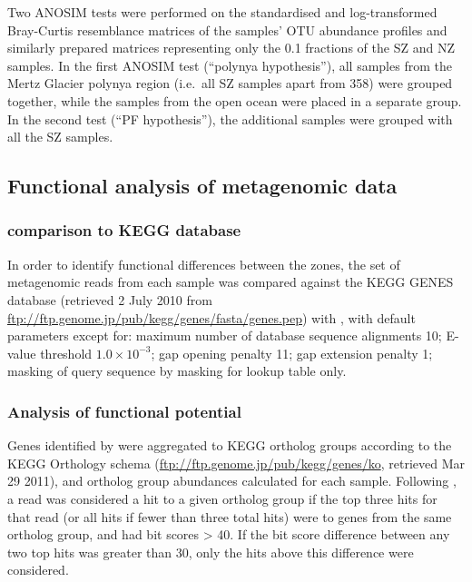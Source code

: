 

Two \ac{ANOSIM} tests were performed on the standardised and log-transformed Bray-Curtis resemblance matrices of the samples' \ac{OTU} abundance profiles and similarly prepared matrices representing only the 0.1 \micron{} fractions of the \ac{SZ} and \ac{NZ} samples.
In the first \ac{ANOSIM} test (``polynya hypothesis''), all samples from the Mertz Glacier polynya region (i.e.\ all \ac{SZ} samples apart from 358) were grouped together, while the samples from the open ocean were placed in a separate group.
In the second test (``\ac{PF} hypothesis''), the additional samples were grouped with all the \ac{SZ} samples.

\subsection{Functional analysis of metagenomic data}

\subsubsection{ comparison to KEGG database}

In order to identify functional differences between the zones, the set of metagenomic reads from each sample was compared against the \ac{KEGG} GENES database (retrieved 2 July 2010 from \url{ftp://ftp.genome.jp/pub/kegg/genes/fasta/genes.pep}) with , with default parameters except for: maximum number of database sequence alignments 10; E-value threshold $1.0\times10^{-3}$; gap opening penalty 11; gap extension penalty 1; masking of query sequence by  masking for lookup table only.

\subsubsection{Analysis of functional potential}

Genes identified by  were aggregated to \ac{KEGG} ortholog groups according to the \ac{KEGG} Orthology schema (\url{ftp://ftp.genome.jp/pub/kegg/genes/ko}, retrieved Mar 29 2011), and ortholog group abundances calculated for each sample. 
Following \citet{Coleman:2010jj}, a read was considered a hit to a given ortholog group if the top three hits for that read (or all hits if fewer than three total hits) were to genes from the same ortholog group, and had bit scores \textgreater{} 40. 
If the bit score difference between any two top hits was greater than 30, only the hits above this difference were considered.

